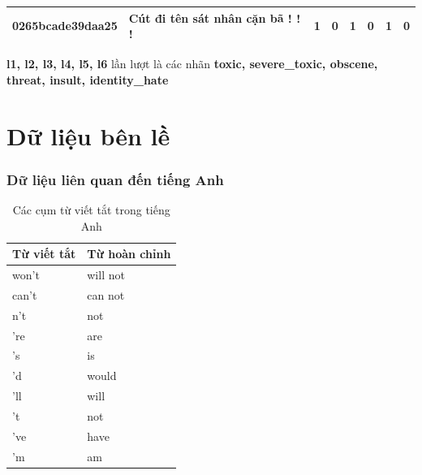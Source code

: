 \begin{table}[htb]
{\begin{minipage}{\textheight}
\begin{threeparttable}
\begin{tabularx}{\textwidth}{L{0.8} L{6.6} C{0.1} C{0.1} C{0.1} C{0.1} C{0.1} C{0.1}}
                    0265bcade39daa25 & Cút đi tên sát nhân cặn bã ! ! !                                                                                                  & 1           & 0           & 1           & 0           & 1           & 0           \\
                    \bottomrule
                \end{tabularx}
                \begin{tablenotes}
                    \fontsize{8pt}{12pt}\selectfont
                    \item \textbf{l1, l2, l3, l4, l5, l6} lần lượt là các nhãn \textbf{toxic, severe\_toxic, obscene, threat, insult, identity\_hate}
                \end{tablenotes}
            \end{threeparttable}
        \end{minipage}%
    }
\end{table}
\clearpage

\chapter*{Dữ liệu bên lề}
\subsection*{Dữ liệu liên quan đến tiếng Anh}
\begin{table}[htb]
    \centering
    \caption{Các cụm từ viết tắt trong tiếng Anh}
    \label{table:english-contractions}
    \begin{tabular}{ll}
        \toprule
        \textbf{Từ viết tắt} & \textbf{Từ hoàn chỉnh} \\\midrule
        won't                & will not               \\
        can't                & can not                \\
        n't                  & not                    \\
        're                  & are                    \\
        's                   & is                     \\
        'd                   & would                  \\
        'll                  & will                   \\
        't                   & not                    \\
        've                  & have                   \\
        'm                   & am                     \\
        \bottomrule
    \end{tabular}
\end{table}

